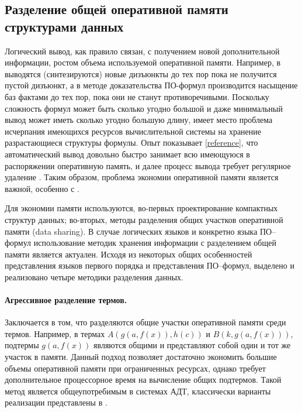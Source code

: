 \subsection{Разделение общей оперативной памяти структурами данных}
Логический вывод, как правило связан, с получением новой дополнительной информации, ростом объема используемой оперативной памяти. Например, в  выводятся (синтезируются) новые дизъюнкты до тех пор пока не получится пустой дизъюнкт, а в методе доказательства ПО-формул производится насыщение баз фактами до тех пор, пока они не станут противоречивыми. Поскольку сложность формул может быть сколько угодно большой и даже минимальный вывод может иметь сколько угодно большую длину, имеет место проблема исчерпания имеющихся ресурсов вычислительной системы на хранение разрастающиеся структуры формулы. Опыт показывает \ref{reference}, что автоматический вывод довольно быстро занимает всю имеющуюся в распоряжении оперативную память, и далее процесс вывода требует регулярное удаление . Таким образом, проблема экономии оперативной памяти является важной, особенно с .

Для экономии памяти используются, во-первых проектирование компактных структур данных; во-вторых, методы разделения общих участков оперативной памяти (data sharing). В случае логических языков и конкретно языка ПО--формул использование методик хранения информации с разделением общей памяти является актуален. Исходя из некоторых общих особенностей представления языков первого порядка и представления ПО--формул, выделено и реализовано четыре методики разделения данных.


\paragraph{Агрессивное разделение термов.} Заключается в том, что разделяются общие участки оперативной памяти среди термов. Например, в термах $A(g(a,f(x)),h(c))$ и $B(k,g(a,f(x)))$, подтермы $g(a,f(x))$ являются общими и представляют собой один и тот же участок в памяти. Данный подход позволяет достаточно экономить большие объемы оперативной памяти при ограниченных ресурсах, однако требует дополнительное процессорное время на вычисление общих подтермов. Такой метод является общеупотребимым в системах АДТ, классически варианты реализации представлены в \cite{}.


